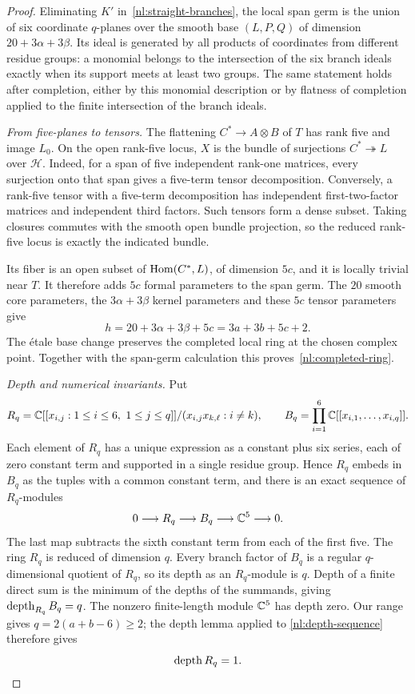 \begin{proof}
Eliminating $K'$ in~\eqref{nl:straight-branches}, the local span germ
is the union of six coordinate $q$-planes over the smooth base
$(L,P,Q)$ of dimension $20+3\alpha+3\beta$. Its ideal is generated
by all products of coordinates from different residue groups:
a monomial belongs to the intersection of the six branch ideals
exactly when its support meets at least two groups. The same statement
holds after completion, either by this monomial description or by
flatness of completion applied to the finite intersection of the
branch ideals.

\medskip
\emph{From five-planes to tensors.}
The flattening $C^*\to A\otimes B$ of $T$ has rank five and image
$L_0$. On the open rank-five locus, $X$ is the bundle of surjections
$C^*\twoheadrightarrow L$ over $\mathcal H$.
Indeed, for a span of five independent rank-one matrices, every
surjection onto that span gives a five-term tensor decomposition.
Conversely, a rank-five tensor with a five-term decomposition has
independent first-two-factor matrices and independent third factors.
Such tensors form a dense subset. Taking closures commutes with the
smooth open bundle projection, so the reduced rank-five locus is
exactly the indicated bundle.

Its fiber is an open subset of $\operatorname{Hom}(C^*,L)$, of dimension $5c$,
and it is locally trivial near $T$. It therefore adds $5c$ formal
parameters to the span germ. The $20$ smooth core parameters, the
$3\alpha+3\beta$ kernel parameters and these $5c$ tensor parameters
give
\[
 h=20+3\alpha+3\beta+5c=3a+3b+5c+2.
\]
The \'etale base change preserves the completed local ring at the
chosen complex point. Together with the span-germ calculation this
proves~\eqref{nl:completed-ring}.

\medskip
\emph{Depth and numerical invariants.}
Put
\[
 R_q=\mathbb C[[x_{i,j}:1\leq i\leq6,\ 1\leq j\leq q]]
                 /(x_{i,j}x_{k,\ell}:i\neq k),\qquad
 B_q=\prod_{i=1}^6\mathbb C[[x_{i,1},\ldots,x_{i,q}]].
\]
Each element of $R_q$ has a unique expression as a constant plus
six series, each of zero constant term and supported in a single
residue group. Hence $R_q$ embeds in $B_q$ as the tuples with a
common constant term, and there is an exact sequence of $R_q$-modules
\begin{equation}\label{nl:depth-sequence}
 0\longrightarrow R_q\longrightarrow B_q
        \longrightarrow\mathbb C^5\longrightarrow0.
\end{equation}
The last map subtracts the sixth constant term from each of the first
five. The ring $R_q$ is reduced of dimension $q$. Every branch factor
of $B_q$ is a regular $q$-dimensional quotient of $R_q$, so its
depth as an $R_q$-module is $q$. Depth of a finite direct sum is the
minimum of the depths of the summands, giving $\operatorname{depth}_{R_q} B_q=q$.
The nonzero finite-length module $\mathbb C^5$ has depth zero. Our range
gives $q=2(a+b-6)\geq2$; the depth lemma applied to
\eqref{nl:depth-sequence} therefore gives
\[
 \operatorname{depth} R_q=1.
\]


\end{proof}
